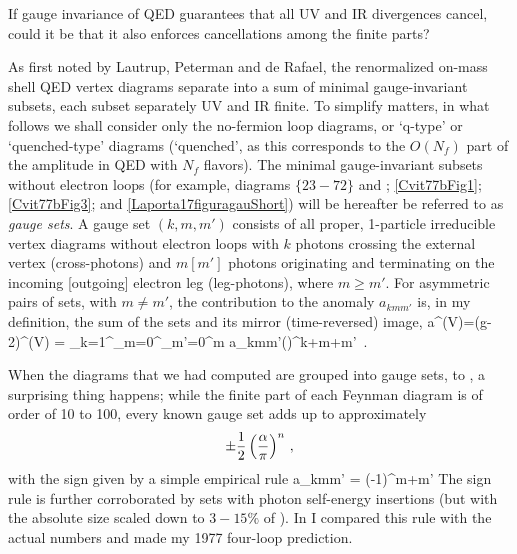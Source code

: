 If gauge invariance of QED guarantees that all UV and IR divergences
cancel, could it be that it also enforces cancellations among the finite
parts?

As first noted by Lautrup, Peterman and de Rafael, the
renormalized on-mass shell QED vertex diagrams separate into a sum of
minimal gauge-invariant subsets, each subset separately UV and IR finite.
To simplify matters, in what follows we shall consider only the
no-fermion loop diagrams, or `q-type' or `quenched-type' diagrams
(`quenched', as this corresponds to the $O(N_f)$ part of the amplitude in
QED with $N_f$ flavors).
The minimal
gauge-invariant subsets without electron loops (for example,
 diagrams $\{23-72\}$ and ;
\ref{Cvit77bFig1}; \ref{Cvit77bFig3}; and \ref{Laporta17figuragauShort})
will be hereafter be referred to as \emph{gauge sets}. A gauge set
$(k,m,m')$ consists of all proper, 1-particle irreducible vertex diagrams
without electron loops with $k$ photons crossing the external vertex
(cross-photons) and $m [m']$ photons originating and terminating on the
incoming [outgoing] electron leg (leg-photons), where $m\geq m'$. For
asymmetric pairs of sets, with $m\neq m'$, the contribution to the
anomaly $a_{kmm'}$ is, in my definition, the sum of the sets and its
mirror (time-reversed) image,
\beq
a^{(V)}=(g-2)^{(V)}
       =  \sum_{k=1}^\infty\sum_{m=0}^\infty\sum_{m'=0}^m
          a_{kmm'}\left(\frac{\alpha}{\pi}\right)^{k+m+m'}
\,.

When the diagrams that we had computed are grouped into
gauge sets,  to ,
a surprising thing happens; while the
finite part of each Feynman diagram is of order of 10 to 100, every
known gauge set adds up to approximately
$$
		   \pm {1 \over 2} \left(\frac{\alpha}{\pi}\right)^n
\,,
$$
with the sign given by a simple empirical rule
\beq
a_{kmm'} = (-1)^{m+m'}
The sign rule is further corroborated by sets with photon
self-energy insertions (but with the absolute size scaled down to
$3-15\%$ of ).
In  I compared this rule with the actual numbers and
made my 1977 four-loop prediction.

